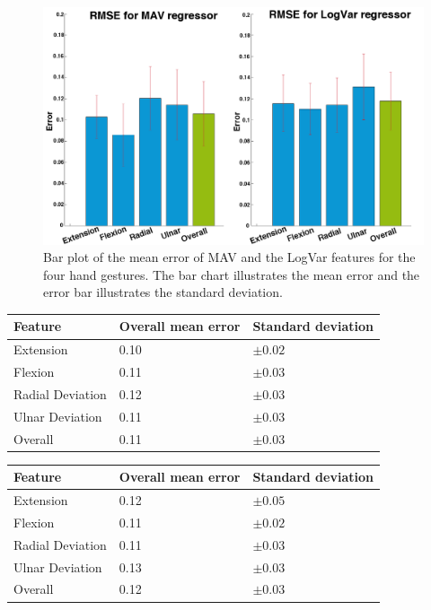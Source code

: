 \begin{figure}[H]
	\includegraphics[width=1\textwidth]{figures/results/gimmeThemRMSEBars}  %
	\caption{Bar plot of the mean error of MAV and the LogVar features for the four hand gestures. The bar chart illustrates the mean error and the error bar illustrates the standard deviation.}
	\label{fig:gimmeThemRMSEBars}  %
\end{figure}

	\begin{center}
		\begin{tabular}{l l l}
			\toprule
			\textbf{Feature} & \textbf{Overall mean error} & \textbf{Standard deviation}\\
			\midrule
			Extension & 0.10 & $\pm 0.02$ \\
			Flexion & 0.11 & $\pm 0.03$ \\
			Radial Deviation & 0.12 & $\pm 0.03$ \\
			Ulnar Deviation & 0.11 & $\pm 0.03$ \\
			Overall & 0.11 & $\pm 0.03$ \\
			\bottomrule
		\end{tabular}
	\end{center}
	
	\begin{center}
		\begin{tabular}{l l l}
			\toprule
			\textbf{Feature} & \textbf{Overall mean error} & \textbf{Standard deviation}\\
			\midrule
			Extension & 0.12 & $\pm 0.05$ \\
			Flexion & 0.11 & $\pm 0.02$ \\
			Radial Deviation & 0.11 & $\pm 0.03$ \\
			Ulnar Deviation & 0.13 & $\pm 0.03$ \\
			Overall & 0.12 & $\pm 0.03$ \\
			\bottomrule
		\end{tabular}
	\end{center}

